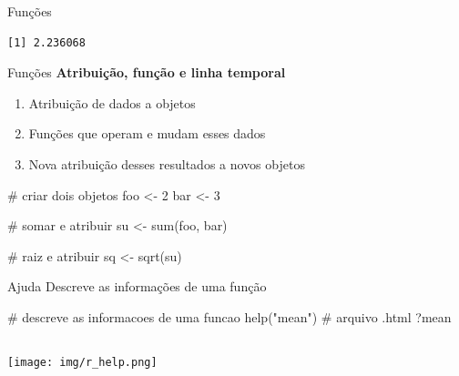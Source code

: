 \documentclass[
  ignorenonframetext,
]{beamer}
\newenvironment{Shaded}{\begin{snugshade}}{\end{snugshade}}
\newcommand{\CommentTok}[1]{\textcolor[rgb]{0.37,0.37,0.37}{#1}}
\newcommand{\DecValTok}[1]{\textcolor[rgb]{0.68,0.00,0.00}{#1}}
\newcommand{\FunctionTok}[1]{\textcolor[rgb]{0.28,0.35,0.67}{#1}}
\newcommand{\NormalTok}[1]{\textcolor[rgb]{0.00,0.23,0.31}{#1}}
\newcommand{\OtherTok}[1]{\textcolor[rgb]{0.00,0.23,0.31}{#1}}
\newcommand{\StringTok}[1]{\textcolor[rgb]{0.13,0.47,0.30}{#1}}
\begin{document}
\begin{frame}[fragile]
\begin{block}{Funções}
\begin{verbatim}
[1] 2.236068
\end{verbatim}
\end{block}

\begin{block}{Funções}
\protect\hypertarget{funuxe7uxf5es-7}{}
\textbf{Atribuição, função e linha temporal}

\begin{enumerate}
\item
  Atribuição de dados a objetos
\item
  Funções que operam e mudam esses dados
\item
  Nova atribuição desses resultados a novos objetos
\end{enumerate}

\begin{Shaded}
\begin{Highlighting}[]
\CommentTok{\# criar dois objetos}
\NormalTok{foo }\OtherTok{\textless{}{-}} \DecValTok{2}
\NormalTok{bar }\OtherTok{\textless{}{-}} \DecValTok{3}

\CommentTok{\# somar e atribuir}
\NormalTok{su }\OtherTok{\textless{}{-}} \FunctionTok{sum}\NormalTok{(foo, bar)}

\CommentTok{\# raiz e atribuir}
\NormalTok{sq }\OtherTok{\textless{}{-}} \FunctionTok{sqrt}\NormalTok{(su)}
\end{Highlighting}
\end{Shaded}
\end{block}

\begin{block}{Ajuda}
\protect\hypertarget{ajuda}{}
Descreve as informações de uma função

\begin{Shaded}
\begin{Highlighting}[]
\CommentTok{\# descreve as informacoes de uma funcao}
\FunctionTok{help}\NormalTok{(}\StringTok{"mean"}\NormalTok{) }\CommentTok{\# arquivo .html}
\NormalTok{?mean}
\end{Highlighting}
\end{Shaded}

\begin{columns}[T]
\begin{column}{0.5\textwidth}
\texttt{[image: img/r\_help.png]}
\end{column}


\end{columns}
\end{block}
\end{frame}
\end{document}
